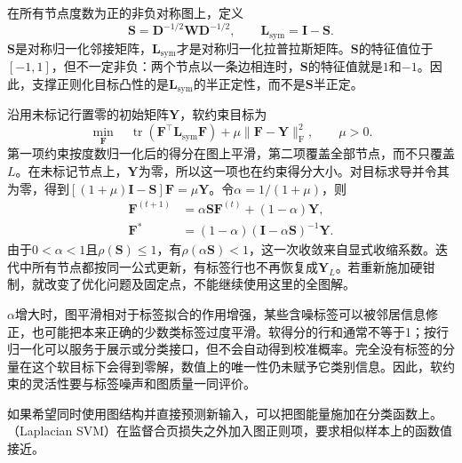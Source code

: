 在所有节点度数为正的非负对称图上，定义
\begin{equation}
  \label{eq:classification-label-spreading-matrices}
  \bm{S}=\bm{D}^{-1/2}\bm{W}\bm{D}^{-1/2},
  \qquad
  \bm{L}_{\mathrm{sym}}=\bm{I}-\bm{S}.
\end{equation}
$\bm{S}$是对称归一化邻接矩阵，$\bm{L}_{\mathrm{sym}}$才是对称归一化拉普拉斯矩阵。$\bm{S}$的特征值位于$[-1,1]$，但不一定非负：两个节点以一条边相连时，$\bm{S}$的特征值就是$1$和$-1$。因此，支撑正则化目标凸性的是$\bm{L}_{\mathrm{sym}}$的半正定性，而不是$\bm{S}$半正定。

沿用未标记行置零的初始矩阵$\bm{Y}$，软约束目标为
\begin{equation}
  \label{eq:classification-label-spreading-objective}
  \min_{\bm{F}}\quad
    \operatorname{tr}
      (\bm{F}^{\top}\bm{L}_{\mathrm{sym}}\bm{F})
    +\mu\lVert\bm{F}-\bm{Y}\rVert_{\mathrm{F}}^2,
  \qquad \mu>0.
\end{equation}
第一项约束按度数归一化后的得分在图上平滑，第二项覆盖全部节点，而不只覆盖$L$。在未标记节点上，$\bm{Y}$为零，所以这一项也在约束得分大小。对目标求导并令其为零，得到$[(1+\mu)\bm{I}-\bm{S}]\bm{F}=\mu\bm{Y}$。令$\alpha=1/(1+\mu)$，则
\begin{equation}
  \label{eq:classification-label-spreading-fixed-point}
  \begin{aligned}
    \bm{F}^{(t+1)}
      &=\alpha\bm{S}\bm{F}^{(t)}+(1-\alpha)\bm{Y},\\
    \bm{F}^\ast
      &=(1-\alpha)(\bm{I}-\alpha\bm{S})^{-1}\bm{Y}.
  \end{aligned}
\end{equation}
由于$0<\alpha<1$且$\rho(\bm{S})\leq1$，有$\rho(\alpha\bm{S})<1$，这一次收敛来自显式收缩系数。迭代中所有节点都按同一公式更新，有标签行也不再恢复成$\bm{Y}_L$。若重新施加硬钳制，就改变了优化问题及固定点，不能继续使用这里的全图解。

$\alpha$增大时，图平滑相对于标签拟合的作用增强，某些含噪标签可以被邻居信息修正，也可能把本来正确的少数类标签过度平滑。软得分的行和通常不等于1；按行归一化可以服务于展示或分类接口，但不会自动得到校准概率。完全没有标签的分量在这个软目标下会得到零解，数值上的唯一性仍未赋予它类别信息。因此，软约束的灵活性要与标签噪声和图质量一同评价。

如果希望同时使用图结构并直接预测新输入，可以把图能量施加在分类函数上。（Laplacian SVM）在监督合页损失之外加入图正则项，要求相似样本上的函数值接近。

